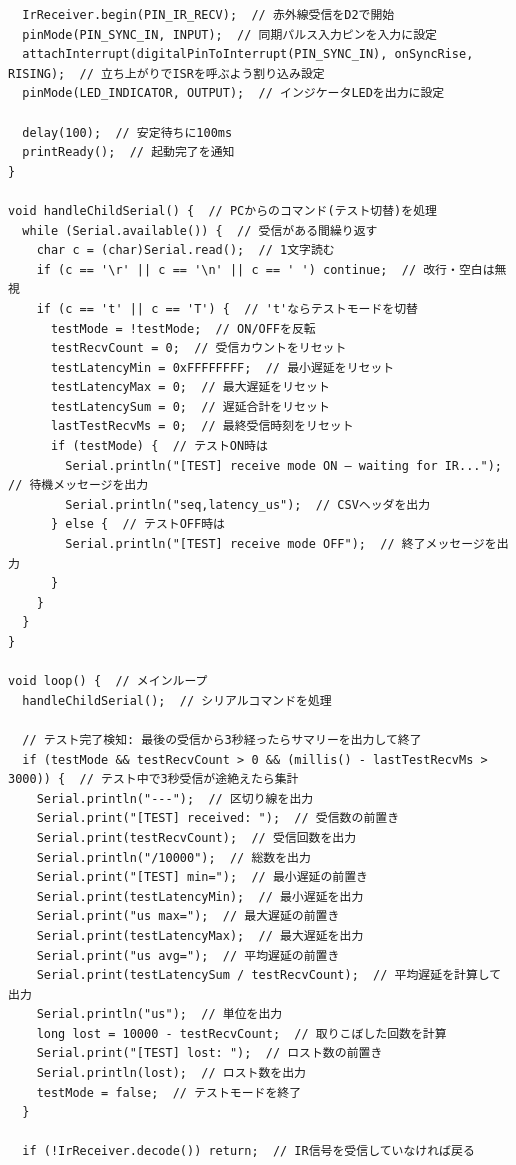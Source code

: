 \documentclass[uplatex,dvipdfmx]{jlreq}
\begin{document}
\begin{lstlisting}
  IrReceiver.begin(PIN_IR_RECV);  // 赤外線受信をD2で開始
  pinMode(PIN_SYNC_IN, INPUT);  // 同期パルス入力ピンを入力に設定
  attachInterrupt(digitalPinToInterrupt(PIN_SYNC_IN), onSyncRise, RISING);  // 立ち上がりでISRを呼ぶよう割り込み設定
  pinMode(LED_INDICATOR, OUTPUT);  // インジケータLEDを出力に設定

  delay(100);  // 安定待ちに100ms
  printReady();  // 起動完了を通知
}

void handleChildSerial() {  // PCからのコマンド(テスト切替)を処理
  while (Serial.available()) {  // 受信がある間繰り返す
    char c = (char)Serial.read();  // 1文字読む
    if (c == '\r' || c == '\n' || c == ' ') continue;  // 改行・空白は無視
    if (c == 't' || c == 'T') {  // 't'ならテストモードを切替
      testMode = !testMode;  // ON/OFFを反転
      testRecvCount = 0;  // 受信カウントをリセット
      testLatencyMin = 0xFFFFFFFF;  // 最小遅延をリセット
      testLatencyMax = 0;  // 最大遅延をリセット
      testLatencySum = 0;  // 遅延合計をリセット
      lastTestRecvMs = 0;  // 最終受信時刻をリセット
      if (testMode) {  // テストON時は
        Serial.println("[TEST] receive mode ON — waiting for IR...");  // 待機メッセージを出力
        Serial.println("seq,latency_us");  // CSVヘッダを出力
      } else {  // テストOFF時は
        Serial.println("[TEST] receive mode OFF");  // 終了メッセージを出力
      }
    }
  }
}

void loop() {  // メインループ
  handleChildSerial();  // シリアルコマンドを処理

  // テスト完了検知: 最後の受信から3秒経ったらサマリーを出力して終了
  if (testMode && testRecvCount > 0 && (millis() - lastTestRecvMs > 3000)) {  // テスト中で3秒受信が途絶えたら集計
    Serial.println("---");  // 区切り線を出力
    Serial.print("[TEST] received: ");  // 受信数の前置き
    Serial.print(testRecvCount);  // 受信回数を出力
    Serial.println("/10000");  // 総数を出力
    Serial.print("[TEST] min=");  // 最小遅延の前置き
    Serial.print(testLatencyMin);  // 最小遅延を出力
    Serial.print("us max=");  // 最大遅延の前置き
    Serial.print(testLatencyMax);  // 最大遅延を出力
    Serial.print("us avg=");  // 平均遅延の前置き
    Serial.print(testLatencySum / testRecvCount);  // 平均遅延を計算して出力
    Serial.println("us");  // 単位を出力
    long lost = 10000 - testRecvCount;  // 取りこぼした回数を計算
    Serial.print("[TEST] lost: ");  // ロスト数の前置き
    Serial.println(lost);  // ロスト数を出力
    testMode = false;  // テストモードを終了
  }

  if (!IrReceiver.decode()) return;  // IR信号を受信していなければ戻る


\end{lstlisting}
\end{document}
